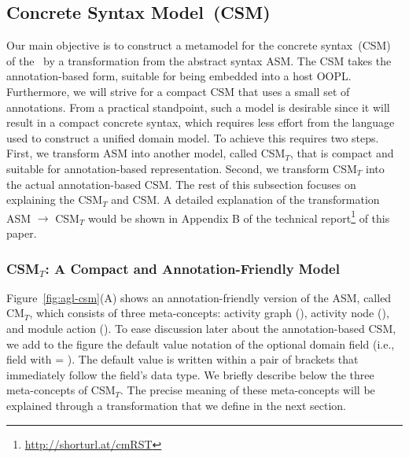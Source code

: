 \subsection{Concrete Syntax Model~(CSM)} \label{sect:agl-asm}

Our main objective is to construct a metamodel for the concrete syntax~(CSM) of the \agl~by a transformation from the abstract syntax ASM. The CSM takes the annotation-based form, suitable for being embedded into a host OOPL. Furthermore, we will strive for a compact CSM that uses a small set of annotations. From a practical standpoint, such a model is desirable since it will result in a compact concrete syntax, which requires less effort from the language used to construct a unified domain model. To achieve this requires two steps. First, we transform ASM into another model, called CSM$_T$, that is compact and suitable for annotation-based representation. Second, we transform CSM$_T$ into the actual annotation-based CSM.
%
The rest of this subsection focuses on explaining the CSM$_T$ and CSM. A detailed explanation of the transformation ASM $\rightarrow$ CSM$_T$ would be shown in Appendix B of the technical report\footnote{\url{http://shorturl.at/cmRST}} of this paper. 

\subsubsection{CSM$_T$: A Compact and Annotation-Friendly Model}
%
Figure~\ref{fig:agl-csm}(A) shows an annotation-friendly version of the ASM, called CM$_T$, which consists of three meta-concepts: activity graph (), activity node (), and module action (). To ease discussion later about the annotation-based CSM, we add to the figure the default value notation of the optional domain field (i.e., field with  = ). The default value is written within a pair of brackets that immediately follow the field's data type.
%
We briefly describe below the three meta-concepts of CSM$_T$. The precise meaning of these meta-concepts will be explained through a transformation that we define in the next section. 

